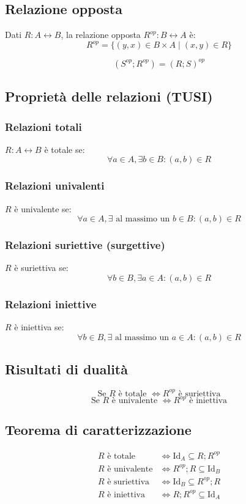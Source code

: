 \documentclass[a4paper,12pt]{article}
\begin{document}
\subsection{Relazione opposta}
Dati $R: A \leftrightarrow B$, la relazione opposta $R^{op}: B \leftrightarrow A$ è:
\[
R^{op} = \{(y,x) \in B \times A \mid (x,y) \in R \}
\]

\[
(S^{op};R^{op}) = (R;S)^{op}
\]

\subsection{Proprietà delle relazioni (TUSI)}

\subsubsection{Relazioni totali}
$R: A \leftrightarrow B$ è totale se:
\[
\forall a \in A, \exists b \in B : (a,b) \in R
\]

\subsubsection{Relazioni univalenti}
$R$ è univalente se:
\[
\forall a \in A, \exists \text{ al massimo un } b \in B : (a,b) \in R
\]

\subsubsection{Relazioni suriettive (surgettive)}
$R$ è suriettiva se:
\[
\forall b \in B, \exists a \in A : (a,b) \in R
\]

\subsubsection{Relazioni iniettive}
$R$ è iniettiva se:
\[
\forall b \in B, \exists \text{ al massimo un } a \in A : (a,b) \in R
\]

\subsection{Risultati di dualità}
\[
\text{Se } R \text{ è totale } \iff R^{op} \text{ è suriettiva}
\]  
\[
\text{Se } R \text{ è univalente } \iff R^{op} \text{ è iniettiva}
\]

\subsection{Teorema di caratterizzazione}
\begin{align*}
R \text{ è totale} &\iff \text{Id}_A \subseteq R;R^{op} \\
R \text{ è univalente} &\iff R^{op};R \subseteq \text{Id}_B \\
R \text{ è suriettiva} &\iff \text{Id}_B \subseteq R^{op};R \\
R \text{ è iniettiva} &\iff R;R^{op} \subseteq \text{Id}_A
\end{align*}
\end{document}
